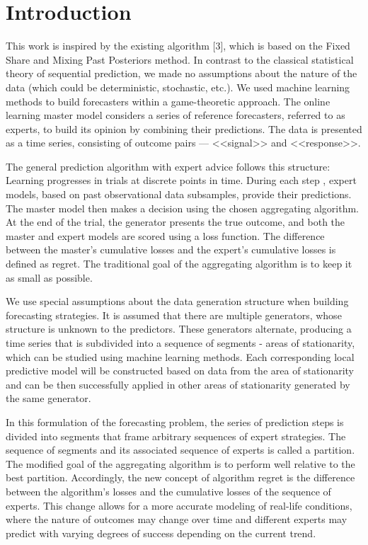 \documentclass[12pt, twoside]{article}
\begin{document}
\section{Introduction}
This work is inspired by the existing algorithm [3], which is based on the Fixed Share and Mixing Past Posteriors method. 
In contrast to the classical statistical theory of sequential prediction, we made no assumptions about the nature of the data (which could be deterministic, stochastic, etc.). 
We used machine learning methods to build forecasters within a game-theoretic approach.
The online learning master model considers a series of reference forecasters, referred to as experts, to build its opinion by combining their predictions.
The data is presented as a time series, consisting of outcome pairs --- <<signal>> and <<response>>. 

The general prediction algorithm with expert advice follows this structure:
Learning progresses in trials at discrete points in time. 
During each step , expert models, based on past observational data subsamples, provide their predictions. 
The master model then makes a decision using the chosen aggregating algorithm. 
At the end of the trial, the generator presents the true outcome, and both the master and expert models are scored using a loss function. 
The difference between the master's cumulative losses and the expert's cumulative losses is defined as regret.
The traditional goal of the aggregating algorithm is to keep it as small as possible.

We use special assumptions about the data generation structure when building forecasting strategies. It is assumed that there are multiple generators, whose structure is unknown to the predictors. These generators alternate, producing a time series that is subdivided into a sequence of segments - areas of stationarity, which can be studied using machine learning methods. Each corresponding local predictive model will be constructed based on data from the area of stationarity and can be then successfully applied in other areas of stationarity generated by the same generator.

In this formulation of the forecasting problem, the series of prediction steps is divided into segments that frame arbitrary sequences of expert strategies. The sequence of segments and its associated sequence of experts is called a partition. The modified goal of the aggregating algorithm is to perform well relative to the best partition. Accordingly, the new concept of algorithm regret is the difference between the algorithm's losses and the cumulative losses of the sequence of experts. This change allows for a more accurate modeling of real-life conditions, where the nature of outcomes may change over time and different experts may predict with varying degrees of success depending on the current trend. 
\end{document}
